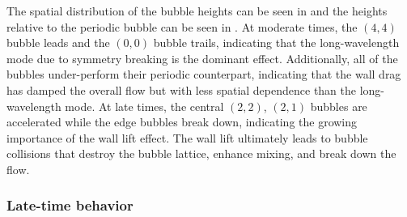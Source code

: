 The spatial distribution of the bubble heights can be seen in  and the heights relative to the periodic bubble can be seen in .
At moderate times, the $(4,4)$ bubble leads and the $(0,0)$ bubble trails, indicating that the long-wavelength mode due to symmetry breaking is the dominant effect.
Additionally, all of the bubbles under-perform their periodic counterpart, indicating that the wall drag has damped the overall flow but with less spatial dependence than the long-wavelength mode.
At late times, the central $(2,2)$, $(2,1)$  bubbles are accelerated while the edge bubbles break down, indicating the growing importance of the wall lift effect.
The wall lift ultimately leads to bubble collisions that destroy the bubble lattice, enhance mixing, and break down the flow.

\subsubsection{Late-time behavior}

